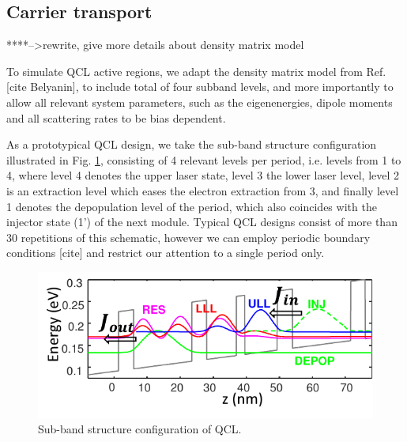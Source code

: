 \documentclass[11pt,final]{scrbook}
\begin{document}
\subsection{Carrier transport}
****-->rewrite, give more details about density matrix model

To simulate QCL active regions, we adapt the density matrix model from Ref. [cite Belyanin], to include total of four subband levels, and more importantly to allow all relevant system parameters, such as the eigenenergies, dipole moments and all scattering rates to be bias dependent. 

As a prototypical QCL design, we take the sub-band structure configuration illustrated in Fig. \ref{fig:4Levels}, consisting of 4 relevant levels per period, i.e. levels from 1 to 4, where level 4 denotes the upper laser state, level 3 the lower laser level, level 2 is an extraction level which eases the electron extraction from 3, and finally level 1 denotes the depopulation level of the period, which also coincides with the injector state (1') of the next module. Typical QCL designs consist of more than 30 repetitions of this schematic, however we can employ periodic boundary conditions [cite] and restrict our attention to a single period only. 

\begin{figure}[htbp]
\begin{center}
\includegraphics[scale=1.2]{images/WFs.pdf}
\caption{Sub-band structure configuration of QCL.}
\label{fig:4Levels}
\end{center}
\end{figure}
\end{document}
